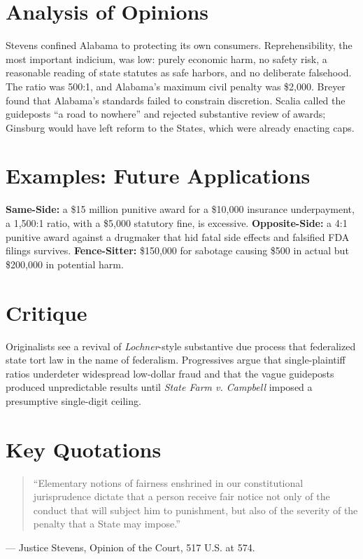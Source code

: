 \documentclass[12pt]{article}
\begin{document}
\section{Analysis of Opinions}
Stevens confined Alabama to protecting its own consumers. Reprehensibility, the most important indicium, was low: purely economic harm, no safety risk, a reasonable reading of state statutes as safe harbors, and no deliberate falsehood. The ratio was 500:1, and Alabama's maximum civil penalty was \$2,000. Breyer found that Alabama's standards failed to constrain discretion. Scalia called the guideposts ``a road to nowhere'' and rejected substantive review of awards; Ginsburg would have left reform to the States, which were already enacting caps.

\section{Examples: Future Applications}
\textbf{Same-Side:} a \$15 million punitive award for a \$10,000 insurance underpayment, a 1,500:1 ratio, with a \$5,000 statutory fine, is excessive. \textbf{Opposite-Side:} a 4:1 punitive award against a drugmaker that hid fatal side effects and falsified FDA filings survives. \textbf{Fence-Sitter:} \$150,000 for sabotage causing \$500 in actual but \$200,000 in potential harm.

\section{Critique}
Originalists see a revival of \textit{Lochner}-style substantive due process that federalized state tort law in the name of federalism. Progressives argue that single-plaintiff ratios underdeter widespread low-dollar fraud and that the vague guideposts produced unpredictable results until \textit{State Farm v. Campbell} imposed a presumptive single-digit ceiling.

\section{Key Quotations}
\begin{quote}
``Elementary notions of fairness enshrined in our constitutional jurisprudence dictate that a person receive fair notice not only of the conduct that will subject him to punishment, but also of the severity of the penalty that a State may impose.''
\end{quote}
\noindent --- Justice Stevens, Opinion of the Court, 517 U.S. at 574.
\end{document}
